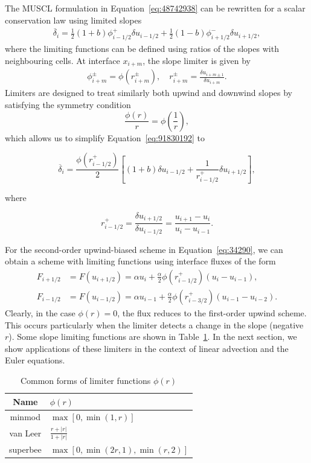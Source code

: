 The MUSCL formulation in Equation~\ref{eq:48742938} can be rewritten for a scalar conservation law using limited slopes 
\begin{align}
	\overline \delta_i = \frac{1}{2}(1+b)\phi^+_{i-1/2}\delta u_{i-1/2} + \frac{1}{2}(1-b)\phi^-_{i+1/2}\delta u_{i+1/2},
	\label{eq:91830192}
\end{align}
where the limiting functions can be defined using ratios of the slopes with neighbouring cells. At interface $x_{i+m}$, the slope limiter is given by
\begin{eqnarray}
	\phi^{\pm}_{i+m} = \phi\left(r^{\pm}_{i+m}\right),\quad r^{\pm}_{i+m} = \frac{\delta u_{i+m\pm 1}}{\delta u_{i+m}}.
\end{eqnarray}
Limiters are designed to treat similarly both upwind and downwind slopes by satisfying the symmetry condition
\begin{equation}
	\frac{\phi(r)}{r} = \phi\left(\frac{1}{r}\right),
\end{equation}
which allows us to simplify Equation~\ref{eq:91830192} to
\begin{eqBox}
	\begin{equation}
		\overline \delta_i = \frac{\phi(r_{i-1/2}^+)}{2} \left[(1+b)\delta u_{i-1/2} + \frac{1}{r_{i-1/2}^+} \delta u_{i+1/2}\right],
	\end{equation}
\end{eqBox}
where
\begin{eqBox}
	\begin{equation}
	r_{i-1/2}^+ = \frac{\delta u_{i+1/2}}{\delta u_{i-1/2}} = \frac{u_{i+1}-u_i}{u_i-u_{i-1}}.
	\end{equation}
\end{eqBox}

For the second-order upwind-biased scheme in Equation~\ref{eq:34290}, we can obtain a scheme with limiting functions using interface fluxes of the form
\begin{align}
	F_{i+1/2} &= F(u_{i+1/2}) = \alpha u_i + \frac{\alpha}{2}\phi(r^+_{i-1/2})\left(u_i-u_{i-1}\right),\\
	F_{i-1/2} &= F(u_{i-1/2}) = \alpha u_{i-1} + \frac{\alpha}{2}\phi(r^+_{i-3/2})\left(u_{i-1}-u_{i-2}\right).
\end{align}
Clearly, in the case $\phi(r) = 0$, the flux reduces to the first-order upwind scheme. This occurs particularly when the limiter detects a change in the slope (negative $r$). Some slope limiting functions are shown in Table~\ref{table:limiters}. In the next section, we show applications of these limiters in the context of linear advection and the Euler equations.
\begin{table}[tb]
	\centering
	\caption{Common forms of limiter functions $\phi(r)$}
	\begin{tabular}{cl}
		\hline
		Name & $\phi(r)$ \\ \hline
		minmod & $\max[0, \min(1, r)]$ \\ 
		van Leer & $\frac{r + |r|}{1 + |r|}$ \\ 
		superbee & $\max[0, \min(2r, 1), \min(r, 2)]$
	\end{tabular}
	\label{table:limiters}
\end{table}

